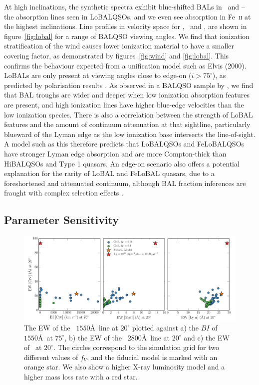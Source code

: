 \documentclass[useAMS,usenatbib]{mn2e_x}
\begin{document}
At high inclinations, the synthetic spectra exhibit blue-shifted BALs in \al\ and \mg --
the absorption lines seen in LoBALQSOs, and we even see absorption in Fe~\textsc{ii}
at the highest inclinations. Line profiles in velocity space 
for \civ, \al\ and \mg, are shown in figure~\ref{fig:lobal} for a range
of BALQSO viewing angles. We find that ionization stratification
of the wind causes lower ionization material to have a smaller covering factor, 
as demonstrated by figures~\ref{fig:wind} and \ref{fig:lobal}.
This confirms the behaviour expected from a unification model such as Elvis (2000). 
LoBALs are only present at viewing angles close to edge-on ($i>75^\circ$),
as predicted by polarisation results \citep{brotherton1997}.
As observed in a BALQSO sample by \cite{filizak2014}, we find that
BAL troughs are wider and deeper when low ionization absorption features are present,
and high ionization lines have higher blue-edge velocities than the 
low ionization species.
There is also a correlation between the strength of LoBAL features
and the amount of continuum attenuation at that sightline, particularly
blueward of the Lyman edge as the low ionization base 
intersects the line-of-sight. 
A model such as this therefore predicts that LoBALQSOs and FeLoBALQSOs 
have stronger Lyman edge absorption and 
are more Compton-thick than HiBALQSOs and Type 1 quasars.
An edge-on scenario also offers a potential explanation for the rarity of LoBAL and
FeLoBAL quasars, due to a foreshortened and attenuated continuum, 
although BAL fraction inferences are fraught with complex selection 
effects \citep{goodrich1997,krolikvoit1998}.


\subsection{Parameter Sensitivity}

\label{sec:param_sens}

\begin{figure}
\centering
\includegraphics[width=1.0\textwidth]{figures/scatter_c4_grid.png}
\caption
{
The EW of the \civ~$1550$\AA\ line at $20^\circ$ plotted against a) the 
$BI$ of \civ~$1550$\AA\ at $75^\circ$, b) the EW of the \mg~$2800$\AA\ line 
at $20^\circ$ and c) the EW of \la\ at $20^\circ$. The circles correspond 
to the simulation grid for two different values of $f_V$, and the fiducial 
model is marked with an orange star. 
We also show a higher X-ray luminosity model and a higher mass loss rate
with a red star.
}
\label{fig:grid}
\end{figure}
\end{document}
